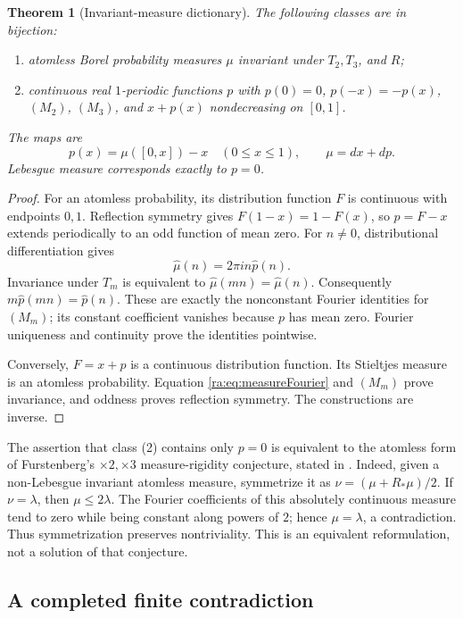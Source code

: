 \documentclass[11pt,a4paper]{article}
\newtheorem{theorem}{Theorem}[section]
\theoremstyle{definition}
\theoremstyle{remark}
\theoremstyle{plain}
\numberwithin{equation}{section}
\begin{document}
\begin{theorem}[Invariant-measure dictionary]\label{ra:thm:dictionary}
The following classes are in bijection:
\begin{enumerate}
\item atomless Borel probability measures $\mu$ invariant under
$T_2,T_3$, and $R$;
\item continuous real $1$-periodic functions $p$ with $p(0)=0$,
$p(-x)=-p(x)$, $(M_2)$, $(M_3)$, and $x+p(x)$ nondecreasing on $[0,1]$.
\end{enumerate}
The maps are
\[
 p(x)=\mu([0,x])-x\quad(0\le x\le1),\qquad \mu=dx+dp.
\]
Lebesgue measure corresponds exactly to $p=0$.
\end{theorem}
\begin{proof}
For an atomless probability, its distribution function $F$ is continuous
with endpoints $0,1$. Reflection symmetry gives $F(1-x)=1-F(x)$,
so $p=F-x$ extends periodically to an odd function of mean zero.
For $n\ne0$, distributional differentiation gives
\begin{equation}\label{ra:eq:measureFourier}
 \widehat\mu(n)=2\pi in\widehat p(n).
\end{equation}
Invariance under $T_m$ is equivalent to
$\widehat\mu(mn)=\widehat\mu(n)$. Consequently
$m\widehat p(mn)=\widehat p(n)$. These are exactly the nonconstant
Fourier identities for $(M_m)$; its constant coefficient vanishes
because $p$ has mean zero. Fourier uniqueness and continuity prove
the identities pointwise.

Conversely, $F=x+p$ is a continuous distribution function. Its
Stieltjes measure is an atomless probability. Equation
\eqref{ra:eq:measureFourier} and $(M_m)$ prove invariance, and oddness
proves reflection symmetry. The constructions are inverse.
\end{proof}

The assertion that class (2) contains only $p=0$ is equivalent to the
atomless form of Furstenberg's $\times2,\times3$ measure-rigidity
conjecture, stated in \cite[Conjecture 1.3]{BadeaGrivaux}.
Indeed, given a non-Lebesgue invariant atomless measure, symmetrize it
as $\nu=(\mu+R_*\mu)/2$. If $\nu=\lambda$, then $\mu\le2\lambda$.
The Fourier coefficients of this absolutely continuous measure tend
to zero while being constant along powers of $2$; hence $\mu=\lambda$,
a contradiction. Thus symmetrization preserves nontriviality.
This is an equivalent reformulation, not a solution of that conjecture.

\subsection{A completed finite contradiction}
\end{document}
